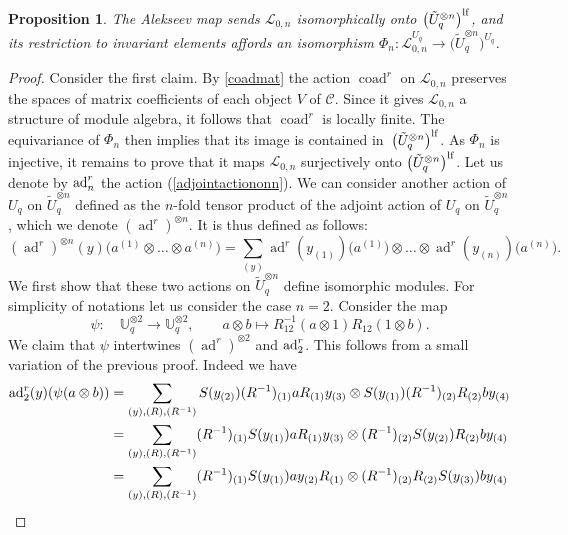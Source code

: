 \documentclass[pdftex]{sigma}%
\numberwithin{equation}{section}
\numberwithin{figure}{section}
\newtheorem{prop}[teo]{Proposition}
\begin{document}
\begin{prop}\label{surjPhiinv}
The Alekseev map sends ${\mathcal L}_{0,n}$ isomorphically onto $\big({\tilde U}_q^{{\otimes} n}\big)^{\rm lf}$, and its restriction to invariant elements affords an isomorphism $\Phi_n\colon {\mathcal L}_{0,n}^{U_q}\rightarrow \big({\tilde U}_q^{{\otimes} n}\big)^{U_q}$.
\end{prop}
\begin{proof} Consider the first claim. By \eqref{coadmat} the action $\operatorname{coad}^r$ on ${\mathcal L}_{0,n}$ preserves the spaces of matrix coefficients of each object $V$ of $\mathcal{C}$. Since it gives ${\mathcal L}_{0,n}$ a structure of module algebra, it follows that $\operatorname{coad}^r$ is locally finite. The equivariance of $\Phi_n$ then implies that its image is contained in~$\big({\tilde U}_q^{{\otimes} n}\big)^{\rm lf}$. As $\Phi_n$ is injective, it remains to prove that it maps ${\mathcal L}_{0,n}$ surjectively onto $\big({\tilde U}_q^{{\otimes} n}\big)^{\rm lf}$. Let us denote by ${\rm ad}_n^r$ the action (\ref{adjointactiononn}). We can consider another action of $U_q$ on $\tilde U_q^{\otimes n}$ defined as the $n$-fold tensor product of the adjoint action of $U_q$ on $\tilde U_q^{\otimes n}$, which we denote $(\operatorname{ad}^r)^{\otimes n}$. It is thus defined as follows:
\[
(\operatorname{ad}^r)^{\otimes n}(y)\big(a^{(1)}\otimes \dots \otimes a^{(n)}\big) = \sum_{(y)} \operatorname{ad}^r(y_{(1)})\big(a^{(1)}\big) \otimes \dots \otimes \operatorname{ad}^r(y_{(n)})\big(a^{(n)}\big).
\]
We first show that these two actions on $\tilde U_q^{\otimes n}$ define isomorphic modules. For simplicity of notations let us consider the case $n=2$. Consider the map
\[
\psi\colon\quad {\mathbb U}_q^{\otimes 2}\rightarrow {\mathbb U}_q^{\otimes 2},\qquad
a\otimes b\mapsto R^{-1}_{12}(a\otimes 1)R_{12}(1\otimes b).
\]
We claim that $\psi$ intertwines $(\operatorname{ad}^r)^{\otimes 2}$ and ${\rm ad}_2^r$. This follows from a small variation of the previous proof. Indeed we have
\begin{align*}
{\rm ad}_2^r(y)(\psi(a\otimes b))&=\sum_{(y), (R), (R^{-1})}S(y_{(2)})(R^{-1})_{(1)}a R_{(1)} y_{(3)}\otimes S(y_{(1)})(R^{-1})_{(2)} R_{(2)} b y_{(4)}
\\
&=\sum_{(y), (R), (R^{-1})}(R^{-1})_{(1)}S(y_{(1)})a R_{(1)} y_{(3)}\otimes (R^{-1})_{(2)} S(y_{(2)}) R_{(2)} b y_{(4)}
\\
&=\sum_{(y), (R), (R^{-1})}(R^{-1})_{(1)}S(y_{(1)})a y_{(2)}R_{(1)}\otimes (R^{-1})_{(2)} R_{(2)} S(y_{(3)}) b y_{(4)}
\\

\end{align*}
\end{proof}
\end{document}
